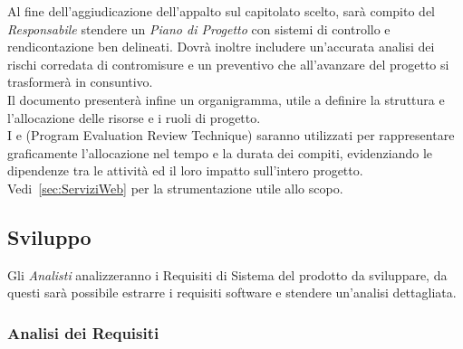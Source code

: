 \documentclass{scalatekids-article}
\begin{document}
Al fine dell'aggiudicazione dell'appalto sul capitolato scelto, sarà compito del
\textit{Responsabile} stendere un \textit{Piano di Progetto} con sistemi di
controllo e rendicontazione ben delineati. Dovrà inoltre includere un'accurata
analisi dei rischi corredata di contromisure e un preventivo che all'avanzare
del progetto si trasformerà in consuntivo.\\
Il documento presenterà infine un organigramma, utile a definire la struttura
e l'allocazione delle risorse e i ruoli di progetto.\\
I  e  (Program Evaluation Review
Technique) saranno utilizzati per rappresentare graficamente l'allocazione nel
tempo e la durata dei compiti, evidenziando le dipendenze tra le attività ed
il loro impatto sull'intero progetto.\\
Vedi~\ref{sec:ServiziWeb} per la strumentazione utile allo scopo.

\subsection{Sviluppo}

Gli \textit{Analisti} analizzeranno i Requisiti di Sistema del prodotto da
sviluppare, da questi sarà possibile estrarre i requisiti software e stendere un'analisi dettagliata.

\subsubsection{Analisi dei Requisiti}
\end{document}
